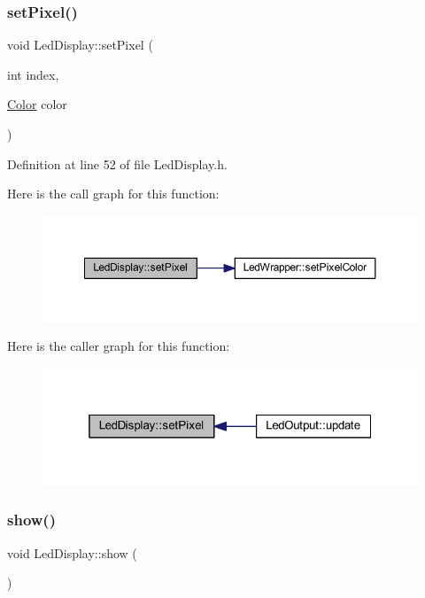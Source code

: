\subsubsection{\texorpdfstring{set\+Pixel()}{setPixel()}}
{\footnotesize\ttfamily void Led\+Display\+::set\+Pixel (\begin{DoxyParamCaption}\item[{int}]{index,  }\item[{\hyperlink{struct_color}{Color}}]{color }\end{DoxyParamCaption})\hspace{0.3cm}{\ttfamily [inline]}}



Definition at line 52 of file Led\+Display.\+h.

Here is the call graph for this function\+:\nopagebreak
\begin{figure}[H]
\begin{center}
\leavevmode
\includegraphics[width=350pt]{class_led_display_ab2333aa2ee8c8aa328917755249d440b_cgraph}
\end{center}
\end{figure}
Here is the caller graph for this function\+:\nopagebreak
\begin{figure}[H]
\begin{center}
\leavevmode
\includegraphics[width=319pt]{class_led_display_ab2333aa2ee8c8aa328917755249d440b_icgraph}
\end{center}
\end{figure}
\mbox{\label{class_led_display_a497d2686d902d16ae001173486dcb7ab}} 
\subsubsection{\texorpdfstring{show()}{show()}}
{\footnotesize\ttfamily void Led\+Display\+::show (\begin{DoxyParamCaption}{ }\end{DoxyParamCaption})\hspace{0.3cm}{\ttfamily [inline]}}



